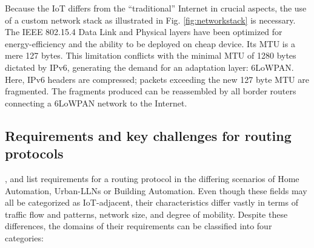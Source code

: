 Because the IoT differs from the ``traditional'' Internet in crucial aspects, the use of a custom network stack as illustrated in Fig. \ref{fig:networkstack} is necessary.\\
The IEEE 802.15.4 Data Link and Physical layers have been optimized for energy-efficiency and the ability to be deployed on cheap device. Its \gls{MTU} is a mere 127 bytes. This limitation conflicts with the minimal MTU of 1280 bytes dictated by IPv6, generating the demand for an adaptation layer: 6LoWPAN. Here, IPv6 headers are compressed; packets exceeding the new 127 byte MTU are fragmented. The fragments produced can be reassembled by all border routers connecting a 6LoWPAN network to the Internet.

\subsection{Requirements and key challenges for routing protocols}
\label{subsec:intro_requirements}
\cite{RFC-5826}, \cite{RFC5548} and \cite{RFC5867} list requirements for a routing protocol in the differing scenarios of Home Automation, Urban-\glspl{LLN} or Building Automation. Even though these fields may all be categorized as IoT-adjacent, their characteristics differ vastly in terms of traffic flow and patterns, network size, and degree of mobility. %
Despite these differences, the domains of their requirements can be classified into four categories:

